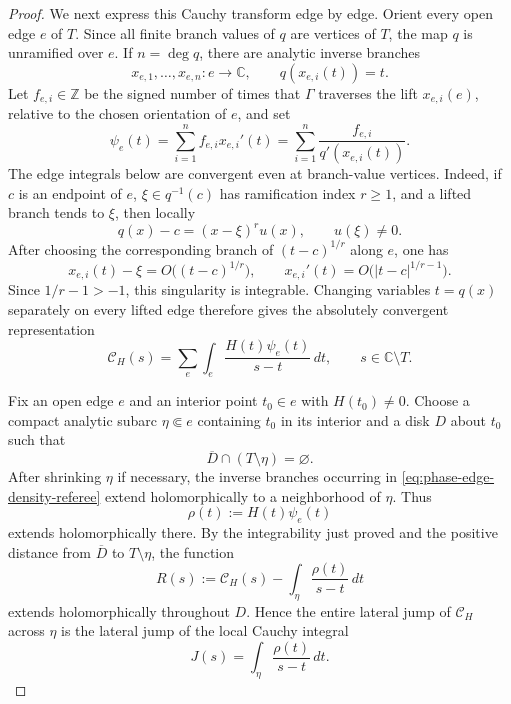 \documentclass[11pt]{article}
\numberwithin{equation}{section}
\theoremstyle{definition}
\theoremstyle{remark}
\newcommand{\C}{\mathbb C}
\newcommand{\Z}{\mathbb Z}
\begin{document}
\begin{proof}
We next express this Cauchy transform edge by edge.  Orient every open edge
$e$ of $T$.  Since all finite branch values of $q$ are vertices of $T$, the
map $q$ is unramified over $e$.  If $n=\deg q$, there are analytic inverse
branches
\[
  x_{e,1},\ldots,x_{e,n}:e\longrightarrow\C,
  \qquad q(x_{e,i}(t))=t.
\]
Let $f_{e,i}\in\Z$ be the signed number of times that $\Gamma$ traverses the
lift $x_{e,i}(e)$, relative to the chosen orientation of $e$, and set
\begin{equation}\label{eq:phase-edge-density-referee}
  \psi_e(t)
  =\sum_{i=1}^n f_{e,i}x_{e,i}'(t)
  =\sum_{i=1}^n\frac{f_{e,i}}{q'(x_{e,i}(t))}.
\end{equation}
The edge integrals below are convergent even at branch-value vertices.  Indeed,
if $c$ is an endpoint of $e$, $\xi\in q^{-1}(c)$ has ramification index
$r\ge1$, and a lifted branch tends to $\xi$, then locally
\[
  q(x)-c=(x-\xi)^r u(x),
  \qquad u(\xi)\ne0.
\]
After choosing the corresponding branch of $(t-c)^{1/r}$ along $e$, one has
\[
  x_{e,i}(t)-\xi=O\bigl((t-c)^{1/r}\bigr),
  \qquad
  x_{e,i}'(t)=O\bigl(|t-c|^{1/r-1}\bigr).
\]
Since $1/r-1>-1$, this singularity is integrable.  Changing variables
$t=q(x)$ separately on every lifted edge therefore gives the absolutely
convergent representation
\begin{equation}\label{eq:phase-edge-Cauchy-referee}
  \mathcal C_H(s)
  =\sum_e\int_e\frac{H(t)\psi_e(t)}{s-t}\,dt,
  \qquad s\in\C\setminus T.
\end{equation}

Fix an open edge $e$ and an interior point $t_0\in e$ with $H(t_0)\ne0$.
Choose a compact analytic subarc $\eta\Subset e$ containing $t_0$ in its
interior and a disk $D$ about $t_0$ such that
\[
  \overline D\cap(T\setminus\eta)=\varnothing.
\]
After shrinking $\eta$ if necessary, the inverse branches occurring in
\eqref{eq:phase-edge-density-referee} extend holomorphically to a neighborhood
of $\eta$.  Thus
\[
  \rho(t):=H(t)\psi_e(t)
\]
extends holomorphically there.  By the integrability just proved and the
positive distance from $\overline D$ to $T\setminus\eta$, the function
\[
  R(s):=\mathcal C_H(s)-\int_\eta\frac{\rho(t)}{s-t}\,dt
\]
extends holomorphically throughout $D$.  Hence the entire lateral jump of
$\mathcal C_H$ across $\eta$ is the lateral jump of the local Cauchy integral
\[
  J(s)=\int_\eta\frac{\rho(t)}{s-t}\,dt.
\]


\end{proof}
\end{document}
